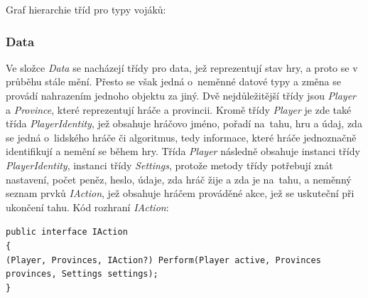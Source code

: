 \documentclass[a4paper,12pt]{article}
\def\keyword #1{\color{keyword}#1\color{black}}
\begin{document}

Graf hierarchie tříd pro typy vojáků:


\subsubsection{Data}
Ve složce \textit{Data} se nacházejí třídy pro data, jež reprezentují stav hry, a proto se v průběhu stále mění. Přesto se však jedná o~neměnné datové typy a změna se provádí nahrazením jednoho objektu za jiný. Dvě nejdůležitější třídy jsou \textit{Player} a \textit{Province}, které reprezentují hráče a provincii. Kromě třídy \textit{Player} je zde také třída \textit{PlayerIdentity}, jež obsahuje hráčovo jméno, pořadí na~tahu, hru a údaj, zda se jedná o~lidského hráče či algoritmus, tedy informace, které hráče jednoznačně identifikují a nemění se během hry. Třída \textit{Player} následně obsahuje instanci třídy \textit{PlayerIdentity}, instanci třídy \textit{Settings}, protože metody třídy potřebují znát nastavení, počet peněz, heslo, údaje, zda hráč žije a zda je na~tahu, a neměnný seznam prvků \textit{IAction}, jež obsahuje hráčem prováděné akce, jež se uskuteční při ukončení tahu. Kód rozhraní \textit{IAction}:

\scriptsize\selectfont
\texttt{\keyword{public interface }IAction}\\
\texttt{\{}\\
\hspace*{8mm}\texttt{(Player, Provinces, IAction?) Perform(Player active, Provinces provinces, Settings settings);}\\
\texttt{\}}\normalsize
\end{document}
